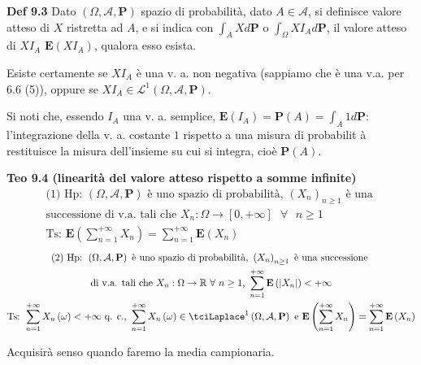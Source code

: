 \documentclass{article}
\begin{document}
\textbf{Def 9.3} Dato $\left( \Omega ,\mathcal{A},\mathbf{P}\right) $ spazio
di probabilit\`{a}, dato $A\in \mathcal{A}$, si definisce valore atteso di $%
X $ ristretta ad $A$, e si indica con $\int_{A}Xd\mathbf{P}$ o $\int_{\Omega
}XI_{A}d\mathbf{P}$, il valore atteso di $XI_{A}$ $\mathbf{E}\left(
XI_{A}\right) $, qualora esso esista.

Esiste certamente se $XI_{A}$ \`{e} una v. a. non negativa (sappiamo che 
\`{e} una v.a. per 6.6 (5)), oppure se $XI_{A}\in \mathcal{L}^{1}\left(
\Omega ,\mathcal{A},\mathbf{P}\right) $.

Si noti che, essendo $I_{A}$ una v. a. semplice, $\mathbf{E}\left(
I_{A}\right) =\mathbf{P}\left( A\right) =\int_{A}1d\mathbf{P}$:
l'integrazione della v. a. costante $1$ rispetto a una misura di probabilit%
\`{a} restituisce la misura dell'insieme su cui si integra, cio\`{e} $%
\mathbf{P}\left( A\right) $.

\textbf{Teo 9.4 (linearit\`{a} del valore atteso rispetto a somme infinite)}%
\begin{gather*}
\text{(1) Hp: }\left( \Omega ,\mathcal{A},\mathbf{P}\right) \text{ \`{e} uno
spazio di probabilit\`{a}, }\left( X_{n}\right) _{n\geq 1}\text{ \`{e} una }
\\
\text{successione di v.a. tali che }X_{n}:\Omega \rightarrow \left[
0,+\infty \right] \text{ }\forall \text{ }n\geq 1 \\
\text{Ts: }\mathbf{E}\left( \sum_{n=1}^{+\infty }X_{n}\right)
=\sum_{n=1}^{+\infty }\mathbf{E}\left( X_{n}\right)
\end{gather*}%
\begin{gather*}
\text{(2) Hp: }\left( \Omega ,\mathcal{A},\mathbf{P}\right) \text{ \`{e} uno
spazio di probabilit\`{a}, }\left( X_{n}\right) _{n\geq 1}\text{ \`{e} una
successione } \\
\text{di v.a. tali che }X_{n}:\Omega \rightarrow 
\mathbb{R}
\text{ }\forall \text{ }n\geq 1\text{, }\sum_{n=1}^{+\infty }\mathbf{E}%
\left( \left\vert X_{n}\right\vert \right) <+\infty \\
\text{Ts: }\sum_{n=1}^{+\infty }X_{n}\left( \omega \right) <+\infty \text{
q. c., }\sum_{n=1}^{+\infty }X_{n}\left( \omega \right) \in \tciLaplace
^{1}\left( \Omega ,\mathcal{A},\mathbf{P}\right) \text{ e }\mathbf{E}\left(
\sum_{n=1}^{+\infty }X_{n}\right) =\sum_{n=1}^{+\infty }\mathbf{E}\left(
X_{n}\right)
\end{gather*}

Acquisir\`{a} senso quando faremo la media campionaria.
\end{document}
